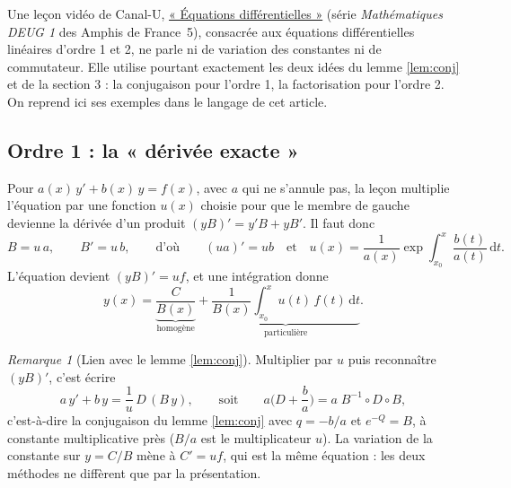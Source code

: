 \documentclass[11pt,a4paper]{article}
\theoremstyle{plain}
\theoremstyle{definition}
\theoremstyle{remark}
\newtheorem{remarque}[theoreme]{Remarque}
\newcommand{\Dx}{D}
\newcommand{\dd}{\mathrm{d}}
\begin{document}
Une leçon vidéo de Canal-U, \href{https://www.canal-u.tv/chaines/les-amphis-de-france-5/mathematiques-deug-1/equations-differentielles}{« Équations différentielles »} (série \emph{Mathématiques DEUG 1} des Amphis de France~5), consacrée aux équations différentielles linéaires d'ordre 1 et 2, ne parle ni de variation des constantes ni de commutateur. Elle utilise pourtant exactement les deux idées du lemme \ref{lem:conj} et de la section 3 : la conjugaison pour l'ordre 1, la factorisation pour l'ordre 2. On reprend ici ses exemples dans le langage de cet article.

\subsection{Ordre 1 : la « dérivée exacte »}

Pour $a(x)\,y' + b(x)\,y = f(x)$, avec $a$ qui ne s'annule pas, la leçon multiplie l'équation par une fonction $u(x)$ choisie pour que le membre de gauche devienne la dérivée d'un produit $(yB)' = y'B + yB'$. Il faut donc
\[
  B = u\,a, \qquad B' = u\,b,
  \qquad\text{d'où}\qquad (ua)' = ub
  \quad\text{et}\quad
  u(x) = \frac{1}{a(x)}\exp\int_{x_0}^{x}\frac{b(t)}{a(t)}\,\dd t .
\]
L'équation devient $(yB)' = uf$, et une intégration donne
\[
  y(x) = \underbrace{\frac{C}{B(x)}}_{\text{homogène}} + \underbrace{\frac{1}{B(x)}\int_{x_0}^{x} u(t)\,f(t)\,\dd t}_{\text{particulière}} .
\]

\begin{remarque}[Lien avec le lemme \ref{lem:conj}]
Multiplier par $u$ puis reconnaître $(yB)'$, c'est écrire
\[
  a\,y' + b\,y = \frac{1}{u}\,\Dx\,(B\,y),
  \qquad\text{soit}\qquad
  a\Big(\Dx + \frac ba\Big) = a\;B^{-1}\circ\Dx\circ B,
\]
c'est-à-dire la conjugaison du lemme \ref{lem:conj} avec $q = -b/a$ et $e^{-Q} = B$, à constante multiplicative près ($B/a$ est le multiplicateur $u$). La variation de la constante sur $y = C/B$ mène à $C' = uf$, qui est la même équation : les deux méthodes ne diffèrent que par la présentation.
\end{remarque}
\end{document}
